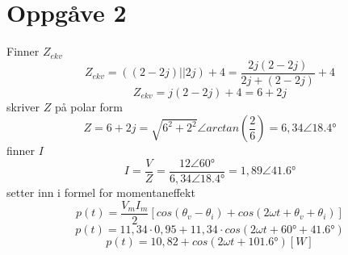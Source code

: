 \documentclass[12pt,a4paper]{article}
\begin{document}
  \section*{Oppgåve 2}
    Finner $Z_{ekv}$
    \begin{equation}
      Z_{ekv} = \left( (2-2j) || 2j \right) + 4 = \frac{2j(2-2j)}{2j+(2-2j)} + 4
    \end{equation}
    \begin{equation}
      Z_{ekv} = j(2-2j) + 4 = 6+2j
    \end{equation}
    skriver $Z$ på polar form
    \begin{equation}
      Z = 6+2j = \sqrt{6^2 + 2^2}\angle arctan \left( \frac{2}{6} \right) =
      6,34\angle \ang{18,4}
    \end{equation}
    finner $I$
    \begin{equation}
      I=\frac{V}{Z} = \frac{12\angle \ang{60}}{6,34 \angle \ang{18,4}} =
      1,89\angle \ang{41,6}
    \end{equation}
    setter inn i formel for momentaneffekt
    \begin{equation}
      p(t) = \frac{V_m I_m}{2} \left[ cos(\theta _v - \theta _i) +
      cos(2\omega t + \theta _v + \theta _i ) \right] 
    \end{equation}
    \begin{equation}
      p(t) = 11,34\cdot0,95 + 11,34\cdot cos(2\omega t + \ang{60} + \ang{41,6})
    \end{equation}
    \begin{equation}
      p(t) = 10,82 + cos(2\omega t + \ang{101,6}) [W]
    \end{equation}

  \newpage
\end{document}
